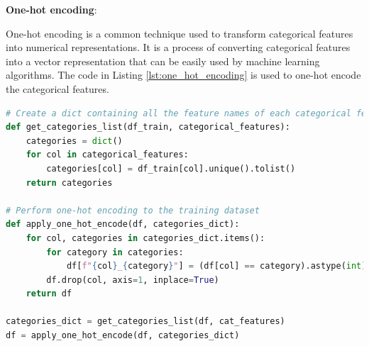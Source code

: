\documentclass[10pt]{article}
\begin{document}
\textbf{One-hot encoding}:

One-hot encoding is a common technique used to transform categorical features into numerical representations. It is a process of converting categorical features into a vector representation that can be easily used by machine learning algorithms. The code in Listing \ref{lst:one_hot_encoding} is used to one-hot encode the categorical features.

\begin{lstlisting}[language=Python, label={lst:one_hot_encoding}, caption={One-hot encode the categorical features}]
# Create a dict containing all the feature names of each categorical feature
def get_categories_list(df_train, categorical_features):
    categories = dict()
    for col in categorical_features:
        categories[col] = df_train[col].unique().tolist()
    return categories

# Perform one-hot encoding to the training dataset
def apply_one_hot_encode(df, categories_dict):
    for col, categories in categories_dict.items():
        for category in categories:
            df[f"{col}_{category}"] = (df[col] == category).astype(int)
        df.drop(col, axis=1, inplace=True)
    return df

categories_dict = get_categories_list(df, cat_features)
df = apply_one_hot_encode(df, categories_dict)
\end{lstlisting}
\end{document}
